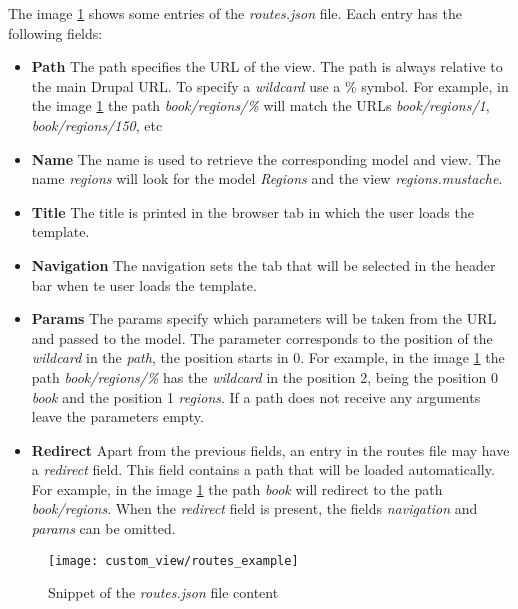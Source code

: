 	The image \ref{fig:rutas_ejemplo} shows some entries of the \textit{routes.json} file.  Each entry has the following fields:
	\begin{itemize}
		\item
			\textbf{Path}  The path specifies the URL of the view.  The path is always relative to the main Drupal URL.  To specify a \textit{wildcard} use a \% symbol.  For example, in the image \ref{fig:rutas_ejemplo} the path \textit{book/regions/\%} will match the URLs \textit{book/regions/1}, \textit{book/regions/150}, etc
		
		\item
			\textbf{Name} The name is used to retrieve the corresponding model and view.  The name \textit{regions} will look for the model \textit{Regions} and the view \textit{regions.mustache}.
			
		\item
			\textbf{Title} The title is printed in the browser tab in which the user loads the template.
		
		\item
			\textbf{Navigation}  The navigation sets the tab that will be selected in the header bar when te user loads the template.
		\item
			\textbf{Params}  The params specify which parameters will be taken from the URL and passed to the model.  The parameter corresponds to the position of the \textit{wildcard} in the \textit{path}, the position starts in 0. For example, in the image \ref{fig:rutas_ejemplo} the path \textit{book/regions/\%} has the \textit{wildcard} in the position 2, being the position 0 \textit{book} and the position 1 \textit{regions}.  If a path does not receive any arguments leave the parameters empty.
		\item
			\textbf{Redirect}  Apart from the previous fields, an entry in the routes file may have a \textit{redirect} field.  This field contains a path that will be loaded automatically.  For example, in the image \ref{fig:rutas_ejemplo} the path \textit{book} will redirect to the path \textit{book/regions}.  When the \textit{redirect} field is present, the fields \textit{navigation} and \textit{params} can be omitted.
	\end{itemize}
	
	\begin{figure}[h]
		\centering
		\texttt{[image: custom\_view/routes\_example]}
		\caption{Snippet of the \textit{routes.json} file content}
		\label{fig:rutas_ejemplo}
	\end{figure}
	
